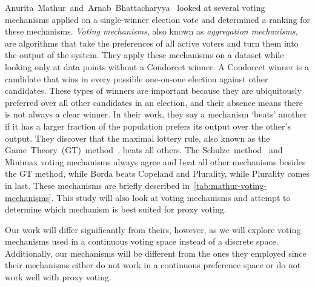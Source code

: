 Anurita~Mathur~and~Arnab~Bhattacharyya~\cite{Mathur2017} looked at several voting
mechanisms applied on a single-winner election vote and determined a ranking for
these mechanisms.
\textit{Voting mechanisms}, also known as \textit{aggregation mechanisms}, are
algorithms that take the preferences of all active voters and turn them into the
output of the system.
They apply these mechanisms on a dataset while looking only at data points without a
Condorcet winner.
A Condorcet winner is a candidate that wins in every possible one-on-one election
against other candidates.
These types of winners are important because they are ubiquitously preferred over
all other candidates in an election, and their absence means there is not always a
clear winner.
In their work, they say a mechanism `beats' another if it has a larger fraction of
the population prefers its output over the other's output.
They discover that the maximal lottery rule, also known as the
Game~Theory~(GT)~method~\cite{Rivest2010}, beats all others.
The Schulze~method~\cite{Schulze2011} and Minimax voting mechanisms always agree and
beat all other mechanisms besides the GT method, while Borda beats Copeland and
Plurality, while Plurality comes in last.
These mechanisms are briefly described in~\autoref{tab:mathur-voting-mechanisms}.
This study will also look at voting mechanisms and attempt to determine which
mechanism is best suited for proxy voting.

Our work will differ significantly from theirs, however, as we will explore voting
mechanisms used in a continuous voting space instead of a discrete space.
Additionally, our mechanisms will be different from the ones they employed since
their mechanisms either do not work in a continuous preference space or do not work
well with proxy voting.

